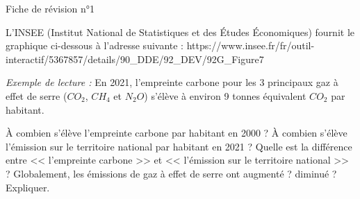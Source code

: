 \documentclass["../Cours.tex"]{subfiles}
\begin{document}
\begin{center}
    {\Huge Fiche de révision n°1}    
\end{center}

\color{black}

\begin{questions}

    L'INSEE (Institut National de Statistiques et des Études Économiques) fournit le graphique ci-dessous à l'adresse suivante :  {\tiny{https://www.insee.fr/fr/outil-interactif/5367857/details/90\_DDE/92\_DEV/92G\_Figure7}}

    \begin{center}
    \end{center}

    \textit{Exemple de lecture :} En 2021, l'empreinte carbone pour les 3 principaux gaz à effet de serre ($CO_2$, $CH_4$ et $N_2O$) s'élève à environ 9 tonnes équivalent $CO_2$ par habitant.

    \question À combien s'élève l'empreinte carbone par habitant en 2000 ?
    \question À combien s'élève l'émission sur le territoire national par habitant en 2021 ?
    \question Quelle est la différence entre << l'empreinte carbone >> et << l'émission sur le territoire national >> ?
    \question Globalement, les émissions de gaz à effet de serre ont augmenté ? diminué ? Expliquer.


\end{questions}
\end{document}
